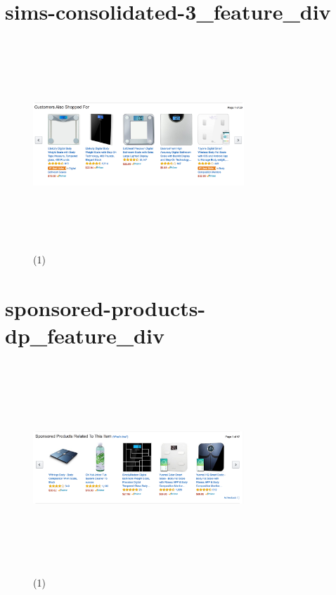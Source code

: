 \documentclass[12pt]{article}
\begin{document}
\section*{sims-consolidated-3\_feature\_div}
\begin{figure}[htp]
\centering
\includegraphics[width=300px,height=300px]{images/sims-consolidated-3_feature_div(1).png}
\caption{(1)}
\end{figure}


\pagebreak

\section*{sponsored-products-dp\_feature\_div}
\begin{figure}[htp]
\centering
\includegraphics[width=300px,height=300px]{images/sponsored-products-dp_feature_div(1).png}
\caption{(1)}
\end{figure}

\pagebreak
\end{document}
